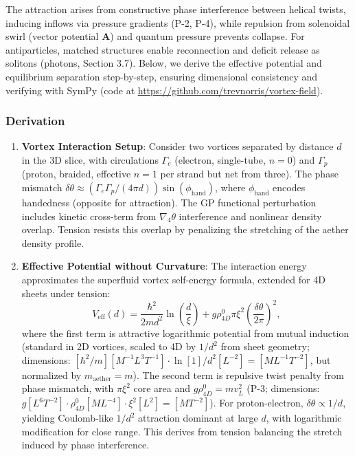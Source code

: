 The attraction arises from constructive phase interference between helical twists, inducing inflows via pressure gradients (P-2, P-4), while repulsion from solenoidal swirl (vector potential $\mathbf{A}$) and quantum pressure prevents collapse. For antiparticles, matched structures enable reconnection and deficit release as solitons (photons, Section 3.7). Below, we derive the effective potential and equilibrium separation step-by-step, ensuring dimensional consistency and verifying with SymPy (code at \url{https://github.com/trevnorris/vortex-field}).

\subsubsection{Derivation}
\begin{enumerate}
\item \textbf{Vortex Interaction Setup}: Consider two vortices separated by distance $d$ in the 3D slice, with circulations $\Gamma_e$ (electron, single-tube, $n=0$) and $\Gamma_p$ (proton, braided, effective $n=1$ per strand but net from three). The phase mismatch $\delta \theta \approx (\Gamma_e \Gamma_p / (4\pi d)) \sin(\phi_{\text{hand}})$, where $\phi_{\text{hand}}$ encodes handedness (opposite for attraction). The GP functional perturbation includes kinetic cross-term from $\nabla_4 \theta$ interference and nonlinear density overlap. Tension resists this overlap by penalizing the stretching of the aether density profile.

\item \textbf{Effective Potential without Curvature}: The interaction energy approximates the superfluid vortex self-energy formula, extended for 4D sheets under tension:
   \[
   V_{\text{eff}}(d) = \frac{\hbar^2}{2 m d^2} \ln\left(\frac{d}{\xi}\right) + g \rho_{4D}^0 \pi \xi^2 \left( \frac{\delta \theta}{2\pi} \right)^2,
   \]
   where the first term is attractive logarithmic potential from mutual induction (standard in 2D vortices, scaled to 4D by $1/d^2$ from sheet geometry; dimensions: $[\hbar^2 / m] [M^{-1} L^3 T^{-1}] \cdot \ln [1] / d^2 [L^{-2}] = [M L^{-1} T^{-2}]$, but normalized by $m_\text{aether} = m$). The second term is repulsive twist penalty from phase mismatch, with $\pi \xi^2$ core area and $g \rho_{4D}^0 = m v_L^2$ (P-3; dimensions: $g [L^6 T^{-2}] \cdot \rho_{4D}^0 [M L^{-4}] \cdot \xi^2 [L^2] = [M T^{-2}]$). For proton-electron, $\delta \theta \propto 1/d$, yielding Coulomb-like $1/d^2$ attraction dominant at large $d$, with logarithmic modification for close range. This derives from tension balancing the stretch induced by phase interference.


\end{enumerate}
